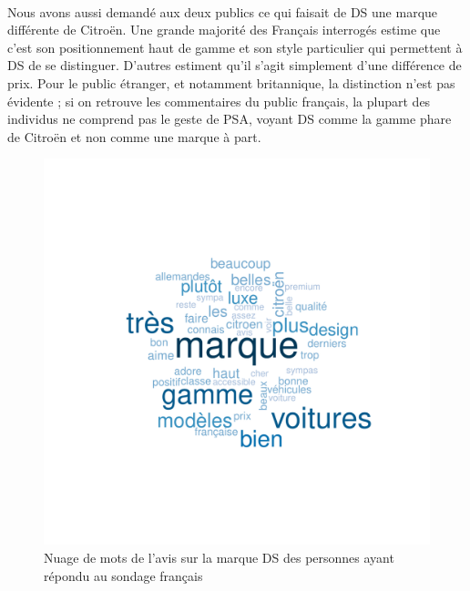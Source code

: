 \documentclass[12pt]{article}\usepackage[]{graphicx}\usepackage[]{color}
\makeatletter
\def\maxwidth{ %
  \ifdim\Gin@nat@width>\linewidth
    \linewidth
  \else
    \Gin@nat@width
  \fi
}
\newenvironment{knitrout}{}{} %
\makeatother
\begin{document}
\paragraph{} Nous avons aussi demandé aux deux publics ce qui faisait de DS une marque différente de Citroën. Une grande majorité des Français interrogés estime que c'est son positionnement haut de gamme et son style particulier qui permettent à DS de se distinguer. D'autres estiment qu'il s'agit simplement d'une différence de prix. Pour le public étranger, et notamment britannique, la distinction n'est pas évidente ; si on retrouve les commentaires du public français, la plupart des individus ne comprend pas le geste de PSA, voyant DS comme la gamme phare de Citroën et non comme une marque à part.

\begin{knitrout}
\color{fgcolor}\begin{figure}[H]
\includegraphics[width=\maxwidth]{figure/brand_fr-1} \caption[Nuage de mots de l'avis sur la marque DS des personnes ayant répondu au sondage français]{Nuage de mots de l'avis sur la marque DS des personnes ayant répondu au sondage français}\label{fig:brand fr}
\end{figure}


\end{knitrout}
\end{document}
